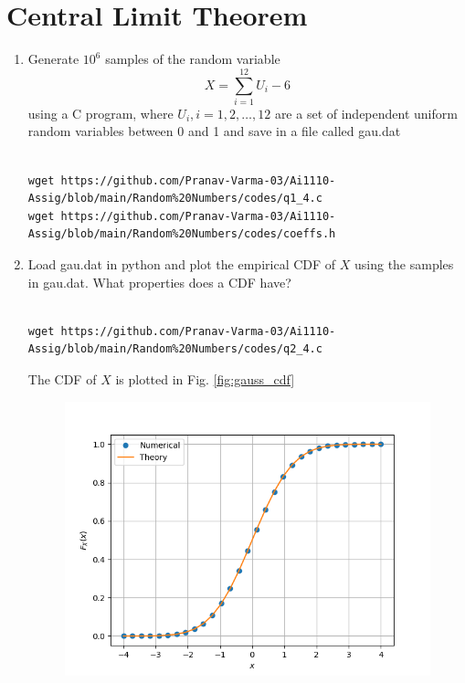 \documentclass[journal,12pt,twocolumn]{IEEEtran}
\renewcommand\thesection{\arabic{section}}
\begin{document}
\section{Central Limit Theorem}
%
\begin{enumerate}[label=\thesection.\arabic*
,ref=\thesection.\theenumi]
%
\item
Generate $10^6$ samples of the random variable
%
\begin{equation}
X = \sum_{i=1}^{12}U_i -6
\end{equation}
%
using a C program, where $U_i, i = 1,2,\dots, 12$ are  a set of independent uniform random variables between 0 and 1
and save in a file called gau.dat\\
%
\solution\\
\begin{lstlisting}
wget https://github.com/Pranav-Varma-03/Ai1110-Assig/blob/main/Random%20Numbers/codes/q1_4.c
wget https://github.com/Pranav-Varma-03/Ai1110-Assig/blob/main/Random%20Numbers/codes/coeffs.h
\end{lstlisting}
\item
Load gau.dat in python and plot the empirical CDF of $X$ using the samples in gau.dat. What properties does a CDF have?
\\
\solution \\
\begin{lstlisting}
wget https://github.com/Pranav-Varma-03/Ai1110-Assig/blob/main/Random%20Numbers/codes/q2_4.c
\end{lstlisting}
The CDF of $X$ is plotted in Fig. \ref{fig:gauss_cdf}
\begin{figure}[ht]
\centering
\includegraphics[width=\columnwidth]{./figs/cdf_plot_gau.png}

\end{figure}
\end{enumerate}
\end{document}
